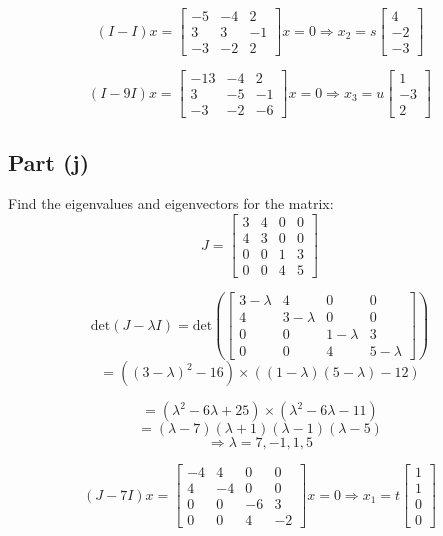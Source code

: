 \documentclass[12pt]{article}
\begin{document}
\[
  (I - I)x = \begin{bmatrix} -5 & -4 & 2 \\ 3 & 3 & -1 \\ -3 & -2 & 2 \end{bmatrix}x = 0 \Rightarrow x_2 = s\begin{bmatrix} 4 \\ -2 \\ -3 \end{bmatrix}
\]

\[
  (I - 9I)x = \begin{bmatrix} -13 & -4 & 2 \\ 3 & -5 & -1 \\ -3 & -2 & -6 \end{bmatrix}x = 0 \Rightarrow x_3 = u\begin{bmatrix} 1 \\ -3 \\ 2 \end{bmatrix}
\]

\pagebreak

\subsection*{Part (j)}
Find the eigenvalues and eigenvectors for the matrix:
\[
J = \begin{bmatrix} 3 & 4 & 0 & 0 \\ 4 & 3 & 0 & 0 \\ 0 & 0 & 1 & 3 \\ 0 & 0 & 4 & 5 \end{bmatrix}
\]

\[
\text{det}(J - \lambda I) = \text{det}\left(\begin{bmatrix} 3-\lambda & 4 & 0 & 0 \\ 4 & 3-\lambda & 0 & 0 \\ 0 & 0 & 1-\lambda & 3 \\ 0 & 0 & 4 & 5-\lambda \end{bmatrix}\right)
\]
\[
= ((3-\lambda)^2 - 16) \times ((1-\lambda)(5-\lambda) - 12)
\]

\[
= (\lambda^2 - 6\lambda + 25) \times (\lambda^2 - 6\lambda - 11)
\]
\[
= (\lambda - 7)(\lambda + 1)(\lambda - 1)(\lambda - 5)
\]
\[
\Rightarrow \lambda = 7, -1, 1, 5
\]

\[
(J - 7I)x = \begin{bmatrix} -4 & 4 & 0 & 0 \\ 4 & -4 & 0 & 0 \\ 0 & 0 & -6 & 3 \\ 0 & 0 & 4 & -2 \end{bmatrix}x = 0 \Rightarrow x_1 = t\begin{bmatrix} 1 \\ 1 \\ 0 \\ 0 \end{bmatrix}
\]
\end{document}
